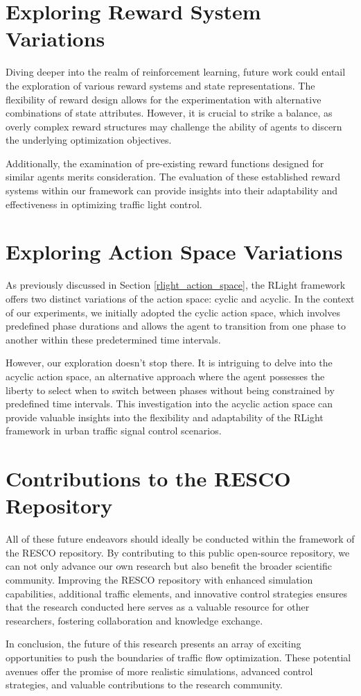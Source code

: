 \section{Exploring Reward System Variations}
Diving deeper into the realm of reinforcement learning, future work could entail the exploration of various reward systems and state representations. The flexibility of reward design allows for the experimentation with alternative combinations of state attributes. However, it is crucial to strike a balance, as overly complex reward structures may challenge the ability of agents to discern the underlying optimization objectives.

Additionally, the examination of pre-existing reward functions designed for similar agents merits consideration. The evaluation of these established reward systems within our framework can provide insights into their adaptability and effectiveness in optimizing traffic light control.

\section{Exploring Action Space Variations}
As previously discussed in Section \ref{rlight_action_space}, the RLight framework offers two distinct variations of the action space: cyclic and acyclic. In the context of our experiments, we initially adopted the cyclic action space, which involves predefined phase durations and allows the agent to transition from one phase to another within these predetermined time intervals.

However, our exploration doesn't stop there. It is intriguing to delve into the acyclic action space, an alternative approach where the agent possesses the liberty to select when to switch between phases without being constrained by predefined time intervals. This investigation into the acyclic action space can provide valuable insights into the flexibility and adaptability of the RLight framework in urban traffic signal control scenarios.

\section{Contributions to the RESCO Repository}
All of these future endeavors should ideally be conducted within the framework of the RESCO repository. By contributing to this public open-source repository, we can not only advance our own research but also benefit the broader scientific community. Improving the RESCO repository with enhanced simulation capabilities, additional traffic elements, and innovative control strategies ensures that the research conducted here serves as a valuable resource for other researchers, fostering collaboration and knowledge exchange.

In conclusion, the future of this research presents an array of exciting opportunities to push the boundaries of traffic flow optimization. These potential avenues offer the promise of more realistic simulations, advanced control strategies, and valuable contributions to the research community.
